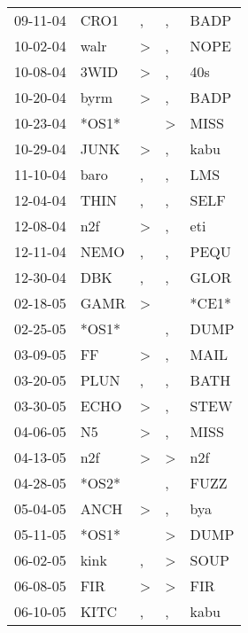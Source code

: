 \begin{supertabular}{lllll}
 09-11-04 &   CRO1 &                , &                , &   BADP \\
 10-02-04 &   walr &     \textgreater &                , &   NOPE \\
 10-08-04 &   3WID &     \textgreater &                , &    40s \\
 10-20-04 &   byrm &     \textgreater &                , &   BADP \\
 10-23-04 &  *OS1* &                  &     \textgreater &   MISS \\
 10-29-04 &   JUNK &     \textgreater &                , &   kabu \\
 11-10-04 &   baro &                , &                , &    LMS \\
 12-04-04 &   THIN &                , &                , &   SELF \\
 12-08-04 &    n2f &     \textgreater &                , &    eti \\
 12-11-04 &   NEMO &                , &                , &   PEQU \\
 12-30-04 &    DBK &                , &                , &   GLOR \\
 02-18-05 &   GAMR &     \textgreater &                  &  *CE1* \\
 02-25-05 &  *OS1* &                  &                , &   DUMP \\
 03-09-05 &     FF &     \textgreater &                , &   MAIL \\
 03-20-05 &   PLUN &                , &                , &   BATH \\
 03-30-05 &   ECHO &     \textgreater &                , &   STEW \\
 04-06-05 &     N5 &     \textgreater &                , &   MISS \\
 04-13-05 &    n2f &     \textgreater &     \textgreater &    n2f \\
 04-28-05 &  *OS2* &                  &                , &   FUZZ \\
 05-04-05 &   ANCH &     \textgreater &                , &    bya \\
 05-11-05 &  *OS1* &                  &     \textgreater &   DUMP \\
 06-02-05 &   kink &                , &     \textgreater &   SOUP \\
 06-08-05 &    FIR &     \textgreater &     \textgreater &    FIR \\
 06-10-05 &   KITC &                , &                , &   kabu \\

\end{supertabular}
